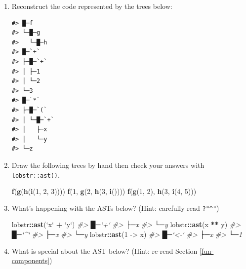 \documentclass[]{book}
\newenvironment{Shaded}{\begin{snugshade}}{\end{snugshade}}
\newcommand{\CommentTok}[1]{\textcolor[rgb]{0.37,0.37,0.37}{\textit{#1}}}
\newcommand{\DataTypeTok}[1]{\textcolor[rgb]{0.27,0.27,0.27}{#1}}
\newcommand{\DecValTok}[1]{\textcolor[rgb]{0.06,0.06,0.06}{#1}}
\newcommand{\KeywordTok}[1]{\textcolor[rgb]{0.27,0.27,0.27}{\textbf{#1}}}
\newcommand{\NormalTok}[1]{#1}
\newcommand{\OperatorTok}[1]{\textcolor[rgb]{0.43,0.43,0.43}{\textbf{#1}}}
\newcommand{\StringTok}[1]{\textcolor[rgb]{0.5,0.5,0.5}{#1}}
\begin{document}
\begin{enumerate}
\def\labelenumi{\arabic{enumi}.}
\item
  Reconstruct the code represented by the trees below:

\begin{verbatim}
#> █─f 
#> └─█─g 
#>   └─█─h
#> █─`+` 
#> ├─█─`+` 
#> │ ├─1 
#> │ └─2 
#> └─3
#> █─`*` 
#> ├─█─`(` 
#> │ └─█─`+` 
#> │   ├─x 
#> │   └─y 
#> └─z
\end{verbatim}
\item
  Draw the following trees by hand then check your answers with
  \texttt{lobstr::ast()}.

\begin{Shaded}
\begin{Highlighting}[]
\KeywordTok{f}\NormalTok{(}\KeywordTok{g}\NormalTok{(}\KeywordTok{h}\NormalTok{(}\KeywordTok{i}\NormalTok{(}\DecValTok{1}\NormalTok{, }\DecValTok{2}\NormalTok{, }\DecValTok{3}\NormalTok{))))}
\KeywordTok{f}\NormalTok{(}\DecValTok{1}\NormalTok{, }\KeywordTok{g}\NormalTok{(}\DecValTok{2}\NormalTok{, }\KeywordTok{h}\NormalTok{(}\DecValTok{3}\NormalTok{, }\KeywordTok{i}\NormalTok{())))}
\KeywordTok{f}\NormalTok{(}\KeywordTok{g}\NormalTok{(}\DecValTok{1}\NormalTok{, }\DecValTok{2}\NormalTok{), }\KeywordTok{h}\NormalTok{(}\DecValTok{3}\NormalTok{, }\KeywordTok{i}\NormalTok{(}\DecValTok{4}\NormalTok{, }\DecValTok{5}\NormalTok{)))}
\end{Highlighting}
\end{Shaded}
\item
  What's happening with the ASTs below? (Hint: carefully read \texttt{?"\^{}"})

\begin{Shaded}
\begin{Highlighting}[]
\NormalTok{lobstr}\OperatorTok{::}\KeywordTok{ast}\NormalTok{(}\StringTok{`}\DataTypeTok{x}\StringTok{`} \OperatorTok{+}\StringTok{ `}\DataTypeTok{y}\StringTok{`}\NormalTok{)}
\CommentTok{#> █─`+` }
\CommentTok{#> ├─x }
\CommentTok{#> └─y}
\NormalTok{lobstr}\OperatorTok{::}\KeywordTok{ast}\NormalTok{(x }\OperatorTok{**}\StringTok{ }\NormalTok{y)}
\CommentTok{#> █─`^` }
\CommentTok{#> ├─x }
\CommentTok{#> └─y}
\NormalTok{lobstr}\OperatorTok{::}\KeywordTok{ast}\NormalTok{(}\DecValTok{1}\NormalTok{ ->}\StringTok{ }\NormalTok{x)}
\CommentTok{#> █─`<-` }
\CommentTok{#> ├─x }
\CommentTok{#> └─1}
\end{Highlighting}
\end{Shaded}
\item
  What is special about the AST below? (Hint: re-read Section
  \ref{fun-components})


\end{enumerate}
\end{document}
